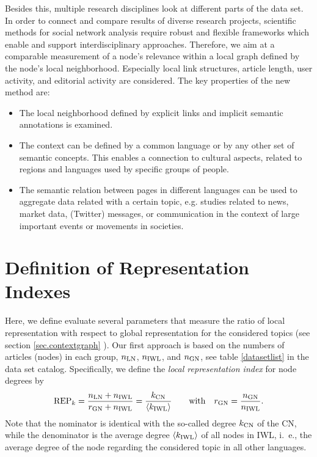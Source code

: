 \documentclass[a4paper,10pt]{scrbook}
\begin{document}
Besides this, multiple research disciplines look at different parts of the data
set. In order to connect and compare results of diverse research
projects, scientific methods for social network analysis require robust and
flexible frameworks which enable and support interdisciplinary approaches.
Therefore, we aim at a comparable measurement of a node's relevance within a local graph
defined by the node's local neighborhood. Especially local link structures,
article length, user activity, and editorial activity are considered.
The key properties of the new method are:
\begin{itemize}
\item The local neighborhood defined by explicit links and implicit 
semantic annotations is examined.
\item The context can be defined by a common language or by any other set of 
semantic concepts. This enables a connection to cultural aspects, related 
to regions and languages used by specific groups of people.
\item The semantic relation between pages in different languages can be used to 
aggregate data related with a certain topic, e.g. studies related to news, market 
data, (Twitter) messages, or communication in the context of large important events 
or movements in societies.
\end{itemize}

\section{Definition of Representation Indexes}

Here, we define evaluate several parameters that measure the ratio of local 
representation with respect to global representation for the considered topics (see section \ref{sec.contextgraph} ). 
Our first approach is based on the numbers of articles (nodes) in each group, 
$n_{\rm LN}$, $n_{\rm IWL}$, and $n_{\rm GN}$, see table \ref{datasetlist} in the data set catalog. 
Specifically, we define the \textit{local representation index} for node degrees by
\begin{equation}
{\rm REP}_k = {n_{\rm LN} + n_{\rm IWL} \over r_{\rm GN} + n_{\rm IWL}} =
{k_{\rm CN} \over \langle k_{\rm IWL} \rangle}
\qquad {\rm with} \quad r_{\rm GN} = {n_{\rm GN} \over n_{\rm IWL}}.
\label{EQ.REPk} 
\end{equation}
Note that the nominator is identical with the so-called degree $k_{\rm CN}$ of 
the CN, while the denominator is the average degree $\langle k_{\rm IWL} \rangle$ 
of all nodes in IWL, i.~e., the average degree of the node regarding the 
considered topic in all other languages.
\end{document}

